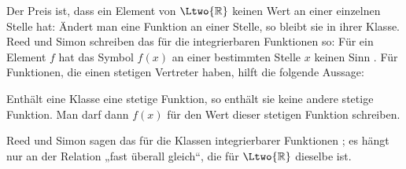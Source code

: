 \begin{fundament}
  Der Preis ist, dass ein Element von $\Ltwo{\mathbb{R}}$ keinen Wert an einer einzelnen
  Stelle hat: Ändert man eine Funktion an einer Stelle, so bleibt sie in ihrer Klasse.
  Reed und Simon schreiben das für die integrierbaren Funktionen so: Für ein Element $f$ hat
  das Symbol $f(x)$ an einer bestimmten Stelle $x$ keinen Sinn .
  Für Funktionen, die einen stetigen Vertreter haben, hilft die folgende Aussage:

  \begin{proposition}\label{c03.prop.stetig}
    Enthält eine Klasse eine stetige Funktion, so enthält sie keine andere stetige
    Funktion. Man darf dann $f(x)$ für den Wert dieser stetigen Funktion schreiben.
  \end{proposition}

  Reed und Simon sagen das für die Klassen integrierbarer Funktionen
  ; es hängt nur an der Relation „fast überall gleich“, die für
  $\Ltwo{\mathbb{R}}$ dieselbe ist.
\end{fundament}

